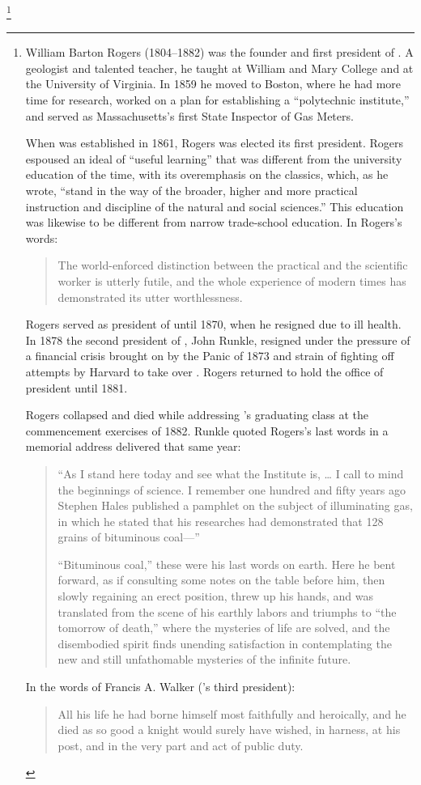 \footnote{
	William Barton Rogers (1804--1882) was the founder and first president of .
	A geologist and talented teacher, he taught at William and Mary College and at the University of Virginia.
	In 1859 he moved to Boston, where he had more time for research, worked on a plan for establishing a “polytechnic institute,” and served as Massachusetts’s first State Inspector of Gas Meters.

	When  was established in 1861, Rogers was elected its first president.
	Rogers espoused an ideal of “useful learning” that was different from the university education of the time, with its overemphasis on the classics, which, as he wrote, “stand in the way of the broader, higher and more practical instruction and discipline of the natural and social sciences.”
	This education was likewise to be different from narrow trade-school education.
	In Rogers’s words:

	\begin{quote}
		The world-enforced distinction between the practical and the scientific worker
		is utterly futile, and the whole experience of modern times has demonstrated
		its utter worthlessness.
	\end{quote}

	Rogers served as president of  until 1870, when he resigned due to ill health.
	In 1878 the second president of , John Runkle, resigned under the pressure of a financial crisis brought on by the Panic of 1873 and strain of fighting off attempts by Harvard to take over .
	Rogers returned to hold the office of president until 1881.

	Rogers collapsed and died while addressing ’s graduating class at the commencement exercises of 1882.
	Runkle quoted Rogers’s last words in a memorial address delivered that same year:

	\begin{quote}
		“As I stand here today and see what the Institute is, … I call to mind the beginnings of science.
		I remember one hundred and fifty years ago Stephen Hales published a pamphlet on the subject of illuminating gas, in which he stated that his researches had demonstrated that 128 grains of bituminous coal---”

		“Bituminous coal,” these were his last words on earth.
		Here he bent forward, as if consulting some notes on the table before him, then slowly regaining an erect position, threw up his hands, and was translated from the scene of his earthly labors and triumphs to “the tomorrow of death,” where the mysteries of life are solved, and the disembodied spirit finds unending satisfaction in contemplating the new and still unfathomable mysteries of the infinite future.
	\end{quote}

	In the words of Francis A. Walker (’s third president):

	\begin{quote}
		All his life he had borne himself most faithfully and heroically, and he died as so good a knight would surely have wished, in harness, at his post, and in the very part and act of public duty.
	\end{quote}
}
